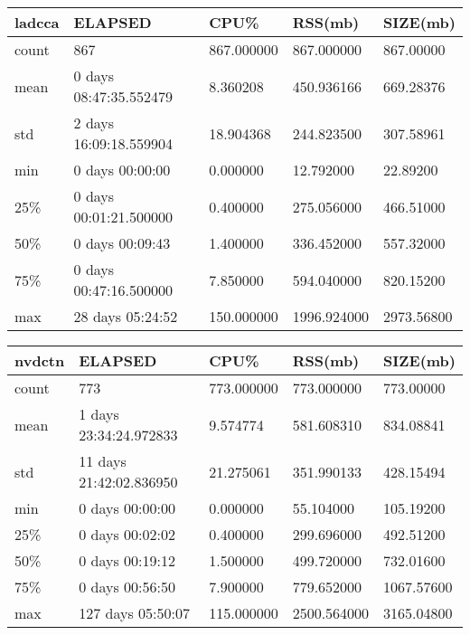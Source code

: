 \documentclass{article}
\begin{document}
\begin{table}[H]
\begin{tabular}{|l|l|l|l|l|}
\hline ladcca& ELAPSED&   CPU\%&  RSS(mb)&   SIZE(mb) \\
\hline count&    867& 867.000000&  867.000000&  867.00000 \\
\hline mean&  0 days 08:47:35.552479&  8.360208&  450.936166&  669.28376 \\
\hline std&  2 days 16:09:18.559904&  18.904368&  244.823500&  307.58961 \\
\hline min&   0 days 00:00:00&  0.000000&  12.792000&  22.89200 \\
\hline 25\%&  0 days 00:01:21.500000&  0.400000&  275.056000&  466.51000 \\
\hline 50\%&   0 days 00:09:43&  1.400000&  336.452000&  557.32000 \\
\hline 75\%&  0 days 00:47:16.500000&  7.850000&  594.040000&  820.15200 \\
\hline max&  28 days 05:24:52& 150.000000& 1996.924000& 2973.56800 \\
\hline 
\end{tabular}
\label{TABLE-SessionSizeladcca}
\end{table}

\begin{table}[H]
\begin{tabular}{|l|l|l|l|l|}
\hline nvdctn&    ELAPSED&   CPU\%&  RSS(mb)&   SIZE(mb) \\
\hline count&   773& 773.000000&  773.000000&  773.00000 \\
\hline mean&  1 days 23:34:24.972833&  9.574774&  581.608310&  834.08841 \\
\hline std&  11 days 21:42:02.836950&  21.275061&  351.990133&  428.15494 \\
\hline min&   0 days 00:00:00&  0.000000&  55.104000&  105.19200 \\
\hline 25\%&   0 days 00:02:02&  0.400000&  299.696000&  492.51200 \\
\hline 50\%&   0 days 00:19:12&  1.500000&  499.720000&  732.01600 \\
\hline 75\%&   0 days 00:56:50&  7.900000&  779.652000& 1067.57600 \\
\hline max&  127 days 05:50:07& 115.000000& 2500.564000& 3165.04800 \\
\hline 
\end{tabular}
\label{TABLE-SessionSizenvdctn}
\end{table}
\end{document}
